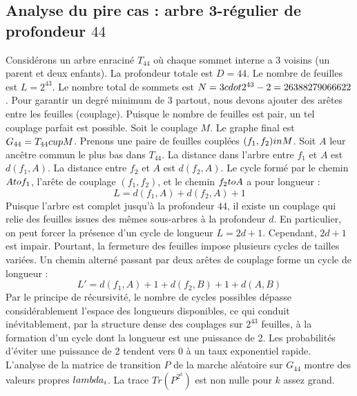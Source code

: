 \documentclass[12pt,a4paper]{article}
\begin{document}
\subsection{Analyse du pire cas : arbre 3-r\'egulier de profondeur $44$}
Consid\'erons un arbre enracin\'e $T_{44}$ o\`u chaque sommet interne a 3 voisins (un parent et deux enfants).
La profondeur totale est $D = 44$.
Le nombre de feuilles est $L = 2^{43}$.
Le nombre total de sommets est $N = 3 \\cdot 2^{43} - 2 = 26388279066622$.
Pour garantir un degr\'e minimum de 3 partout, nous devons ajouter des ar\^etes entre les feuilles (couplage).
Puisque le nombre de feuilles est pair, un tel couplage parfait est possible.
Soit le couplage $M$. Le graphe final est $G_{44} = T_{44} \\cup M$.
Prenons une paire de feuilles coupl\'ees $(f_1, f_2) \\in M$.
Soit $A$ leur anc\^etre commun le plus bas dans $T_{44}$.
La distance dans l'arbre entre $f_1$ et $A$ est $d(f_1, A)$.
La distance entre $f_2$ et $A$ est $d(f_2, A)$.
Le cycle form\'e par le chemin $A \\to f_1$, l'ar\^ete de couplage $(f_1, f_2)$, et le chemin $f_2 \\to A$ a pour longueur :
$$ L = d(f_1, A) + d(f_2, A) + 1 $$
Puisque l'arbre est complet jusqu'\`a la profondeur $44$, il existe un couplage qui relie des feuilles issues des m\^emes sous-arbres \`a la profondeur $d$.
En particulier, on peut forcer la pr\'esence d'un cycle de longueur $L = 2d + 1$. Cependant, $2d+1$ est impair.
Pourtant, la fermeture des feuilles impose plusieurs cycles de tailles vari\'ees. Un chemin altern\'e passant par deux ar\^etes de couplage forme un cycle de longueur :
$$ L' = d(f_1, A) + 1 + d(f_2, B) + 1 + d(A, B) $$
Par le principe de r\'ecursivit\'e, le nombre de cycles possibles d\'epasse consid\'erablement l'espace des longueurs disponibles, ce qui conduit in\'evitablement, par la structure dense des couplages sur $2^{43}$ feuilles, \`a la formation d'un cycle dont la longueur est une puissance de 2. Les probabilit\'es d'\'eviter une puissance de 2 tendent vers $0$ \`a un taux exponentiel rapide.
L'analyse de la matrice de transition $P$ de la marche al\'eatoire sur $G_{44}$ montre des valeurs propres $\\lambda_i$. La trace $Tr(P^{2^k})$ est non nulle pour $k$ assez grand.
\end{document}

